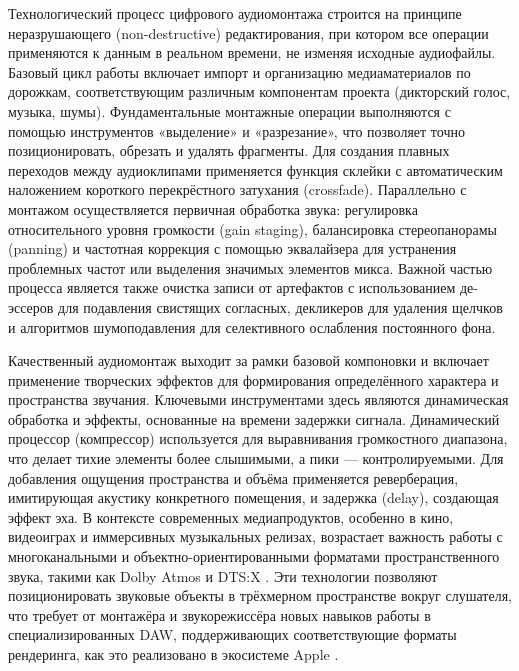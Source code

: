 \documentclass{SibFU-docs}
\begin{document}

Технологический процесс цифрового аудиомонтажа строится на принципе неразрушающего (non-destructive) редактирования, при котором все операции применяются к данным в реальном времени, не изменяя исходные аудиофайлы. Базовый цикл работы включает импорт и организацию медиаматериалов по дорожкам, соответствующим различным компонентам проекта (дикторский голос, музыка, шумы). Фундаментальные монтажные операции выполняются с помощью инструментов «выделение» и «разрезание», что позволяет точно позиционировать, обрезать и удалять фрагменты. Для создания плавных переходов между аудиоклипами применяется функция склейки с автоматическим наложением короткого перекрёстного затухания (crossfade). Параллельно с монтажом осуществляется первичная обработка звука: регулировка относительного уровня громкости (gain staging), балансировка стереопанорамы (panning) и частотная коррекция с помощью эквалайзера для устранения проблемных частот или выделения значимых элементов микса. Важной частью процесса является также очистка записи от артефактов с использованием де-эссеров для подавления свистящих согласных, декликеров для удаления щелчков и алгоритмов шумоподавления для селективного ослабления постоянного фона.


Качественный аудиомонтаж выходит за рамки базовой компоновки и включает применение творческих эффектов для формирования определённого характера и пространства звучания. Ключевыми инструментами здесь являются динамическая обработка и эффекты, основанные на времени задержки сигнала. Динамический процессор (компрессор) используется для выравнивания громкостного диапазона, что делает тихие элементы более слышимыми, а пики — контролируемыми. Для добавления ощущения пространства и объёма применяется реверберация, имитирующая акустику конкретного помещения, и задержка (delay), создающая эффект эха. В контексте современных медиапродуктов, особенно в кино, видеоиграх и иммерсивных музыкальных релизах, возрастает важность работы с многоканальными и объектно-ориентированными форматами пространственного звука, такими как Dolby Atmos \cite{dolby_atmos_guide} и DTS:X \cite{dts_x_standard}. Эти технологии позволяют позиционировать звуковые объекты в трёхмерном пространстве вокруг слушателя, что требует от монтажёра и звукорежиссёра новых навыков работы в специализированных DAW, поддерживающих соответствующие форматы рендеринга, как это реализовано в экосистеме Apple \cite{apple_spatial_audio}.
\end{document}
